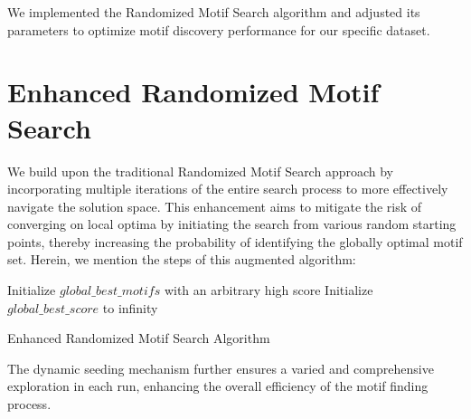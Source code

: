 \documentclass{report}
\begin{document}
    
    We implemented the Randomized Motif Search algorithm and adjusted its parameters to optimize motif discovery performance for our specific dataset.

\newpage

\section{Enhanced Randomized Motif Search}
We build upon the traditional Randomized Motif Search approach by incorporating multiple iterations of the entire search process to more effectively navigate the solution space. This enhancement aims to mitigate the risk of converging on local optima by initiating the search from various random starting points, thereby increasing the probability of identifying the globally optimal motif set.  Herein, we mention the steps of this augmented algorithm:

\begin{algorithm}[H]
    \SetAlgoLined
    Initialize $global\_best\_motifs$ with an arbitrary high score\;
    Initialize $global\_best\_score$ to infinity\;
    \;
    \caption{Enhanced Randomized Motif Search Algorithm}
\end{algorithm}

 The dynamic seeding mechanism further ensures a varied and comprehensive exploration in each run, enhancing the overall efficiency of the motif finding process.
\newpage
\end{document}
